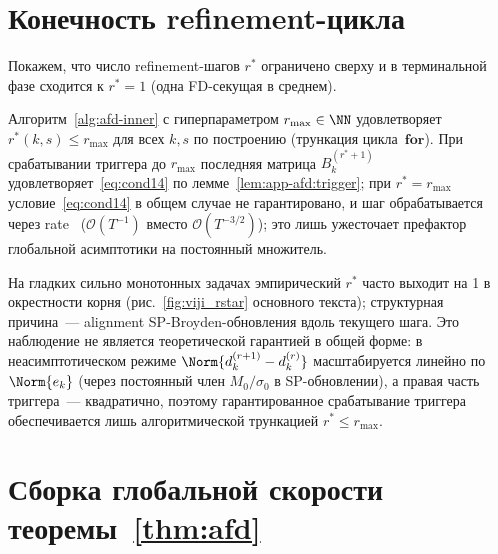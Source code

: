 \section{Конечность refinement-цикла}
\label{sec:app-afd:rstar}

Покажем, что число refinement-шагов $r^{*}$ ограничено сверху и в
терминальной фазе сходится к $r^{*} = 1$ (одна FD-секущая в среднем).

\begin{proposition}[Ограниченность $r^{*}$]
\label{prop:app-afd:rstar}
Алгоритм~\ref{alg:afd-inner} с гиперпараметром $r_{\max} \in \NN$
удовлетворяет $r^{*}(k, s) \le r_{\max}$ для всех $k, s$ по построению
(трункация цикла~$\mathbf{for}$). При срабатывании триггера до $r_{\max}$
последняя матрица $B_k^{(r^{*}+1)}$ удовлетворяет~\eqref{eq:cond14}
по лемме~\ref{lem:app-afd:trigger}; при $r^{*} = r_{\max}$
условие~\eqref{eq:cond14} в общем случае не гарантировано, и шаг
обрабатывается через rate~\cite[Theorem~3.2]{Agafonov2024VIJI}
($\mathcal O(T^{-1})$ вместо $\mathcal O(T^{-3/2})$); это лишь ужесточает
префактор глобальной асимптотики на постоянный множитель.
\end{proposition}

\begin{remark}
\label{rem:app-afd:rstar-emp}
На гладких сильно монотонных задачах эмпирический $r^{*}$ часто выходит
на 1 в окрестности корня (рис.~\ref{fig:viji_rstar} основного текста);
структурная причина~--- alignment SP-Broyden-обновления вдоль текущего
шага. Это наблюдение не является теоретической гарантией в общей форме:
в неасимптотическом режиме $\Norm{d_k^{(r+1)} - d_k^{(r)}}$ масштабируется
линейно по $\Norm{e_k}$ (через постоянный член $M_0/\sigma_0$ в
SP-обновлении), а правая часть триггера~--- квадратично, поэтому
гарантированное срабатывание триггера обеспечивается лишь алгоритмической
трункацией $r^{*} \le r_{\max}$.
\end{remark}

\section{Сборка глобальной скорости теоремы~\ref{thm:afd}}
\label{sec:app-afd:cond14}

